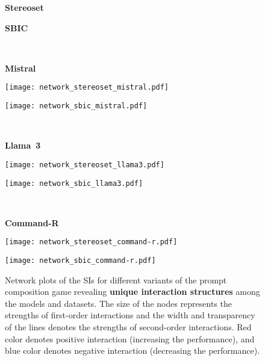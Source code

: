 \begin{figure*}
    \centering
    \begin{minipage}[c]{0.14\linewidth}
    \phantom{a}
    \end{minipage}
    \hfill
    \begin{minipage}[c]{0.40\linewidth}
       \centering\textbf{Stereoset}
    \end{minipage}
    \hfill
    \begin{minipage}[c]{0.40\linewidth}
        \centering\textbf{SBIC}
    \end{minipage}
    \\[1em]
    \begin{minipage}[c]{0.14\linewidth}
    \textbf{Mistral}
    \end{minipage}
    \hfill
    \begin{minipage}[c]{0.40\linewidth}       \centering\texttt{[image: network\_stereoset\_mistral.pdf]}
    \end{minipage}
    \hfill
    \begin{minipage}[c]{0.40\linewidth}
        \centering\texttt{[image: network\_sbic\_mistral.pdf]}
    \end{minipage}
    \\[1em]
    \begin{minipage}[c]{0.14\linewidth}
    \textbf{Llama~3}
    \end{minipage}
    \hfill
    \begin{minipage}[c]{0.40\linewidth}
       \centering\texttt{[image: network\_stereoset\_llama3.pdf]}
    \end{minipage}
    \hfill
    \begin{minipage}[c]{0.40\linewidth}
        \centering\texttt{[image: network\_sbic\_llama3.pdf]}
    \end{minipage}
    \\[1em]
    \begin{minipage}[c]{0.14\linewidth}
    \textbf{Command-R}
    \end{minipage}
    \hfill
    \begin{minipage}[c]{0.40\linewidth}
       \centering\texttt{[image: network\_stereoset\_command-r.pdf]}
    \end{minipage}
    \hfill
    \begin{minipage}[c]{0.40\linewidth}
        \centering\texttt{[image: network\_sbic\_command-r.pdf]}
    \end{minipage}

    \caption{Network plots of the SIs for different variants of the prompt composition game revealing \textbf{unique interaction structures} among the models and datasets. The size of the nodes represents the strengths of first-order interactions and the width and transparency of the lines denotes the strengths of second-order interactions. Red color denotes positive interaction (increasing the performance), and blue color denotes negative interaction (decreasing the performance).}
    \label{fig_network_plots_appendix}
\end{figure*}
